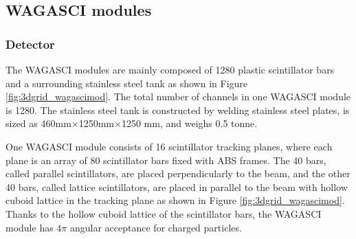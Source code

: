 \subsection{WAGASCI modules}
\subsubsection{Detector}
The WAGASCI modules are mainly composed of 1280 plastic scintillator bars and a surrounding stainless steel tank as shown in Figure \ref{fig:3dgrid_wagascimod}.
The total number of channels in one WAGASCI module is 1280.
The stainless steel tank is constructed by welding stainless steel plates, is sized as 460mm$\times$1250mm$\times$1250 mm, and weighs 0.5 tonne. 


One WAGASCI module consists of 16 scintillator tracking planes, where each plane is an array of 80 scintillator bars fixed with ABS frames.
The 40 bars, called parallel scintillators, are placed perpendicularly to the beam, and the other 40 bars, called lattice scintillators, are placed in parallel to the beam with hollow cuboid lattice in the tracking plane as shown in Figure \ref{fig:3dgrid_wagascimod}.
Thanks to the hollow cuboid lattice of the scintillator bars, 
the WAGASCI module has $4\pi$ angular acceptance for charged particles.

